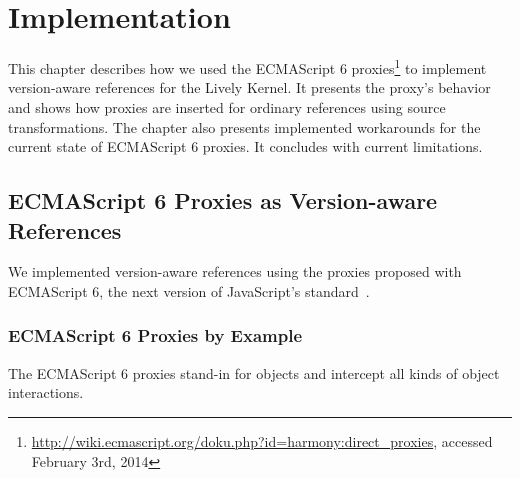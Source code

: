 

\chapter{Implementation} \label{chapter:IMPLEMENTATION}

This chapter describes how we used the ECMAScript 6 proxies\footnote{\url{http://wiki.ecmascript.org/doku.php?id=harmony:direct_proxies}, accessed February 3rd, 2014} to implement version-aware references for the Lively Kernel.
It presents the proxy's behavior and shows how proxies are inserted for ordinary references using source transformations.
The chapter also presents implemented workarounds for the current state of ECMAScript 6 proxies.
It concludes with current limitations.


\section{ECMAScript 6 Proxies as Version-aware References} \label{sec:IMPLEMENTATION:1}

We implemented version-aware references using the proxies proposed with ECMAScript 6, the next version of JavaScript's standard~\cite{Ecma2014ES6}.

\subsection{ECMAScript 6 Proxies by Example}

    
    


The ECMAScript 6 proxies stand-in for objects and intercept all kinds of object interactions.

